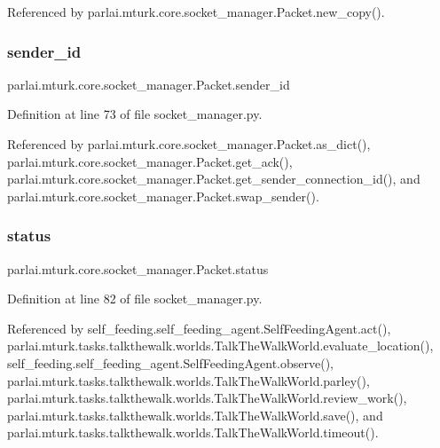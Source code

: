 Referenced by parlai.\+mturk.\+core.\+socket\+\_\+manager.\+Packet.\+new\+\_\+copy().

\mbox{\label{classparlai_1_1mturk_1_1core_1_1socket__manager_1_1Packet_ae1bd1f29599a19fd8c64e2ef01ab77b4}} 
\subsubsection{\texorpdfstring{sender\+\_\+id}{sender\_id}}
{\footnotesize\ttfamily parlai.\+mturk.\+core.\+socket\+\_\+manager.\+Packet.\+sender\+\_\+id}



Definition at line 73 of file socket\+\_\+manager.\+py.



Referenced by parlai.\+mturk.\+core.\+socket\+\_\+manager.\+Packet.\+as\+\_\+dict(), parlai.\+mturk.\+core.\+socket\+\_\+manager.\+Packet.\+get\+\_\+ack(), parlai.\+mturk.\+core.\+socket\+\_\+manager.\+Packet.\+get\+\_\+sender\+\_\+connection\+\_\+id(), and parlai.\+mturk.\+core.\+socket\+\_\+manager.\+Packet.\+swap\+\_\+sender().

\mbox{\label{classparlai_1_1mturk_1_1core_1_1socket__manager_1_1Packet_aeb61b559da8290c5f12c37dbf1fb08d2}} 
\subsubsection{\texorpdfstring{status}{status}}
{\footnotesize\ttfamily parlai.\+mturk.\+core.\+socket\+\_\+manager.\+Packet.\+status}



Definition at line 82 of file socket\+\_\+manager.\+py.



Referenced by self\+\_\+feeding.\+self\+\_\+feeding\+\_\+agent.\+Self\+Feeding\+Agent.\+act(), parlai.\+mturk.\+tasks.\+talkthewalk.\+worlds.\+Talk\+The\+Walk\+World.\+evaluate\+\_\+location(), self\+\_\+feeding.\+self\+\_\+feeding\+\_\+agent.\+Self\+Feeding\+Agent.\+observe(), parlai.\+mturk.\+tasks.\+talkthewalk.\+worlds.\+Talk\+The\+Walk\+World.\+parley(), parlai.\+mturk.\+tasks.\+talkthewalk.\+worlds.\+Talk\+The\+Walk\+World.\+review\+\_\+work(), parlai.\+mturk.\+tasks.\+talkthewalk.\+worlds.\+Talk\+The\+Walk\+World.\+save(), and parlai.\+mturk.\+tasks.\+talkthewalk.\+worlds.\+Talk\+The\+Walk\+World.\+timeout().

